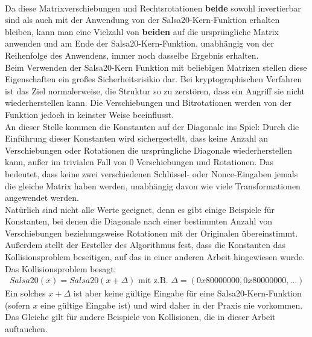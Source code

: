 \documentclass[course=erap]{aspdoc}
\begin{document}
\\Da diese Matrixverschiebungen und Rechtsrotationen \textbf{beide} sowohl invertierbar sind als auch mit der Anwendung von der Salsa20-Kern-Funktion erhalten bleiben,
kann man eine Vielzahl von \textbf{beiden} auf die ursprüngliche Matrix anwenden und am Ende der Salsa20-Kern-Funktion, unabhängig von der Reihenfolge des Anwendens, immer noch dasselbe Ergebnis erhalten.
\\Beim Verwenden der Salsa20-Kern Funktion mit beliebigen Matrizen stellen diese Eigenschaften ein großes Sicherheitsrisikio dar.
Bei kryptographischen Verfahren ist das Ziel normalerweise, die Struktur so zu zerstören, dass ein Angriff sie nicht wie\-der\-her\-ste\-llen kann.
Die Verschiebungen und Bitrotationen werden von der Funktion jedoch in keinster Weise beeinflusst.
\\An dieser Stelle kommen die Konstanten auf der Diagonale ins Spiel:
Durch die Einführung dieser Konstanten wird sichergestellt, dass keine Anzahl an Verschiebungen oder Rotationen die ursprüngliche Diagonale wie\-der\-her\-ste\-llen kann,
außer im trivialen Fall von 0 Verschiebungen und Rotationen. Das bedeutet, dass keine zwei verschiedenen Schlüssel- oder Nonce-Eingaben
jemals die gleiche Matrix haben werden, unabhängig davon wie viele Transformationen angewendet werden.\cite{salsa20security}
\\Natürlich sind nicht alle Werte geeignet, denn es gibt einige Beispiele für Konstanten,
bei denen die Diagonale nach einer bestimmten Anzahl von Verschiebungen be\-ziehungs\-weise Rotationen mit der Originalen übereinstimmt.
\\Außerdem stellt der Ersteller des Algorithmus fest\cite{ResponseOnTheSalsa20Core}, dass die Konstanten das Kollisions\-problem beseitigen,
auf das in einer anderen Arbeit\cite{onTheSalsa20Core} hingewiesen wurde.\\
Das Kollisionsproblem besagt:
\begin{gather*} Salsa20(x) = Salsa20(x + \Delta) \text{  mit z.B.  } \Delta=(0x80000000,0x80000000,...) \end{gather*}
Ein solches $x+\Delta$ ist aber keine gültige Eingabe für eine Salsa20-Kern-Funktion (sofern $x$ eine gültige Eingabe ist) und wird daher in der Praxis nie vorkommen.
Das Gleiche gilt für andere Beispiele von Kollisionen, die in dieser Arbeit auftauchen.
\end{document}
